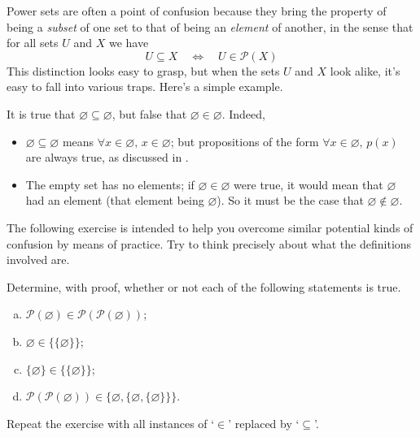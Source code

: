 Power sets are often a point of confusion because they bring the property of being a \textit{subset} of one set to that of being an \textit{element} of another, in the sense that for all sets $U$ and $X$ we have
\[ U \subseteq X \quad \Leftrightarrow \quad U \in \mathcal{P}(X) \]
This distinction looks easy to grasp, but when the sets $U$ and $X$ look alike, it's easy to fall into various traps. Here's a simple example.

\begin{example}
It is true that $\varnothing \subseteq \varnothing$, but false that $\varnothing \in \varnothing$. Indeed,
\begin{itemize}
\item $\varnothing \subseteq \varnothing$ means $\forall x \in \varnothing,\, x \in \varnothing$; but propositions of the form $\forall x \in \varnothing,\, p(x)$ are always true, as discussed in .
\item The empty set has no elements; if $\varnothing \in \varnothing$ were true, it would mean that $\varnothing$ had an element (that element being $\varnothing$). So it must be the case that $\varnothing \not \in \varnothing$.
\end{itemize}
\end{example}

The following exercise is intended to help you overcome similar potential kinds of confusion by means of practice. Try to think precisely about what the definitions involved are.

\begin{exercise}
Determine, with proof, whether or not each of the following statements is true.
\begin{enumerate}[(a)]
\item $\mathcal{P}(\varnothing) \in \mathcal{P}(\mathcal{P}(\varnothing))$;
\item $\varnothing \in \{ \{ \varnothing \} \}$;
\item $\{ \varnothing \} \in \{ \{ \varnothing \} \}$;
\item $\mathcal{P}(\mathcal{P}(\varnothing)) \in \{ \varnothing, \{ \varnothing, \{ \varnothing \} \} \}$.
\end{enumerate}
Repeat the exercise with all instances of `$\in$' replaced by `$\subseteq$'.
\end{exercise}